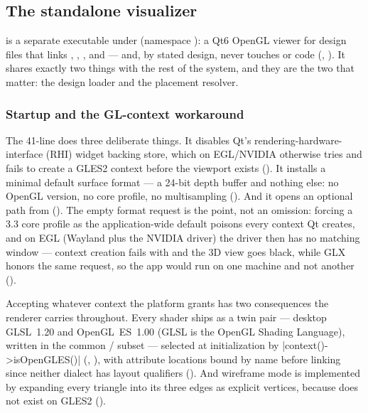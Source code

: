 \subsection{The standalone visualizer}\label{sec:interfaces-viz}

 is a separate executable under  (namespace
): a Qt6 OpenGL viewer for  design files that links
, , , and
 --- and, by stated design, never touches  or 
code (, ). It shares
exactly two things with the rest of the system, and they are the two that matter: the design
loader and the placement resolver.

\subsubsection{Startup and the GL-context workaround}\label{sec:interfaces-viz-startup}

The 41-line  does three deliberate things. It disables
Qt's rendering-hardware-interface (RHI) widget backing store, which on EGL/NVIDIA otherwise
tries and fails to create a GLES2 context before the viewport exists
(). It installs a minimal default surface format --- a 24-bit
depth buffer and nothing else: no OpenGL version, no core profile, no multisampling
(). And it opens an optional  path from
 (). The empty format request is the point, not an
omission: forcing a 3.3 core profile as the application-wide default poisons every context Qt
creates, and on EGL (Wayland plus the NVIDIA driver) the driver then has no matching window
 --- context creation fails with  and the 3D view goes
black, while GLX honors the same request, so the app would run on one machine and not another
().

Accepting whatever context the platform grants has two consequences the renderer carries
throughout. Every shader ships as a twin pair --- desktop GLSL~1.20 and OpenGL~ES~1.00
(GLSL is the OpenGL Shading Language), written in the common
/ subset --- selected at initialization by
\cppinline|context()->isOpenGLES()| (,
), with attribute locations bound by name before
linking since neither dialect has layout qualifiers
(). And wireframe mode is implemented by expanding
every triangle into its three edges as explicit  vertices, because
 does not exist on GLES2 ().

